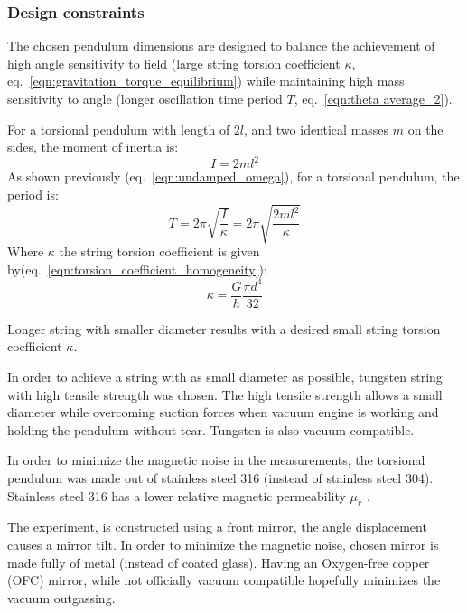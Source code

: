 \documentclass[\main/master.tex]{subfiles}
\begin{document}
\subsubsection{Design constraints}
\par\noindent
The chosen pendulum dimensions are designed to balance the achievement of high angle sensitivity to field (large string torsion coefficient $\kappa$, eq.~\ref{eqn:gravitation_torque_equilibrium}) while maintaining high mass sensitivity to angle (longer oscillation time period $T$, eq.~\ref{eqn:theta average_2}). 
\par\noindent
For a torsional pendulum with length of $2l$, and two identical masses $m$ on the sides, the moment of inertia is:
\begin{equation}
I = 2ml^2     \label{eqn:moment_inertia_2}
\end{equation} 
As shown previously (eq.~\ref{eqn:undamped_omega}), for a torsional pendulum, the period is:
\begin{equation}
T = 2\pi\sqrt{\frac{I}{\kappa}}= 2\pi\sqrt{\frac{2ml^2}{\kappa}}   \label{eqn:undamped_motion_equation_3}
\end{equation}
Where $\kappa$ the string torsion coefficient is given by(eq.~\ref{eqn:torsion_coefficient_homogeneity}):
\begin{equation}
\kappa = \frac{G}{h} \frac{\pi d^4}{32}    \label{eqn:torsion_coefficient}
\end{equation}
\par\noindent
Longer string with smaller diameter results with a desired small string torsion coefficient $\kappa$. 
\par\noindent
In order to achieve a string with as small diameter as possible, tungsten string with high tensile strength was chosen. The high tensile strength allows a small diameter while overcoming suction forces when vacuum engine is working and holding the pendulum without tear. Tungsten is also vacuum compatible. 
\par\noindent
In order to minimize the magnetic noise in the measurements, the torsional pendulum was made out of stainless steel 316 (instead of stainless steel 304). Stainless steel 316 has a lower relative magnetic permeability $\mu_r$ \cite{SS316}.
\par\noindent
The experiment, is constructed using a front mirror, the angle displacement causes a mirror tilt. In order to minimize the magnetic noise, chosen mirror is made fully of metal (instead of coated glass). Having an Oxygen-free copper (OFC) mirror, while not officially vacuum compatible hopefully minimizes the vacuum outgassing.
\end{document}

